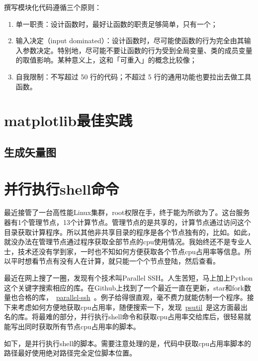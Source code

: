 撰写模块化代码遵循三个原则：

\begin{enumerate}
    \item 单一职责：设计函数时，最好让函数的职责足够简单，只有一个；
    \item 输入决定（input dominated）：设计函数时，尽可能使函数的行为完全由其输入参数决定。特别地，尽可能不要让函数的行为受到全局变量、类的成员变量的取值影响。某种意义上，这和「可重入」的概念比较像；
    \item 自我限制：不写超过 50 行的代码；不超过 5 行的通用功能也要拉出去做工具函数。
\end{enumerate}


\section{matplotlib最佳实践}
\subsection{生成矢量图}

\section{并行执行shell命令}

最近接管了一台高性能Linux集群，root权限在手，终于能为所欲为了。这台服务器有1个管理节点，13个计算节点。管理节点的是共享的，计算节点通过访问这个目录获取计算程序。所以其他非共享目录的程序是各个节点独有的，比如。如此，就没办法在管理节点通过程序获取全部节点的cpu使用情况。我始终还不是专业人士，技术还没有学到家，一时也不知如何方便获取各个节点cpu占用率等信息。所以平时想看节点有没有人在计算，就只能一个个节点登陆，然后查看。

最近在网上搜了一圈，发现有个技术叫Parallel SSH。人生苦短，马上加上Python这个关键字搜索相应的库。在Github上找到了一个最近一直在更新，star和fork数量也合格的库，~\href{https://github.com/ParallelSSH/parallel-ssh}{parallel-ssh}~。例子给得很直观，毫不费力就能仿制一个程序。接下来考虑如何方便地获取cpu占用率，随便搜索一下，发现~\href{https://github.com/giampaolo/psutil}{psutil}~是这方面最出名的库。将最难的部分，并行执行shell命令和获取cpu占用率交给库后，很轻易就能写出同时获取所有节点cpu占用率的脚本。

如下，是并行执行shell的脚本。需要注意处理的是，代码中获取cpu占用率脚本的路径最好使用绝对路径完全定位脚本位置。

\inputminted{python}{code/python/parallel_ex_shell.py}

